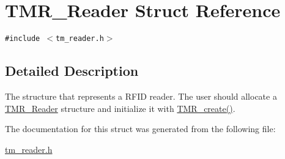 \hypertarget{struct_t_m_r___reader}{
\section{TMR\_\-Reader Struct Reference}
\label{struct_t_m_r___reader}
}
{\tt \#include $<$tm\_\-reader.h$>$}



\subsection{Detailed Description}
The structure that represents a RFID reader. The user should allocate a \hyperlink{struct_t_m_r___reader}{TMR\_\-Reader} structure and initialize it with \hyperlink{group__reader_g77b9edd8d948ab1e1d9b95bf546cc43e}{TMR\_\-create()}. 

The documentation for this struct was generated from the following file:\begin{CompactItemize}
\item 
\hyperlink{tm__reader_8h}{tm\_\-reader.h}\end{CompactItemize}
